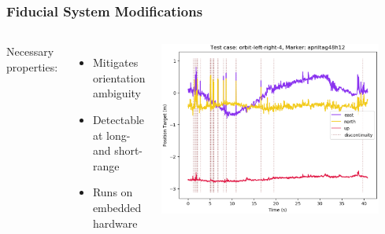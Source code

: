\documentclass[aspectratio=169]{rubeamer}
\newcommand{\nologo}{\setbeamertemplate{logo}{}}
\newif\ifpause
\newcommand{\mypause}{\ifpause \pause \fi}
\begin{document}
\nologo
\begin{frame}
  \frametitle{Fiducial System Modifications}
  \begin{columns}

    Necessary properties:
    \begin{itemize}
      \item Mitigates orientation ambiguity
      \mypause
      \item Detectable at long- and short-range
      \mypause
      \item Runs on embedded hardware
    \end{itemize}
    \centering
    \onslide
    \includegraphics[width=0.9\textwidth]{orbit-left-right-4_apriltag48h12_position-target}
  \end{columns}
\end{frame}
\end{document}
